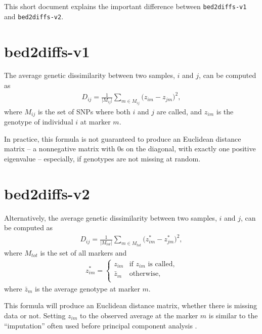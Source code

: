 \documentclass[draft,a4paper,10pt,DIV=15,titlepage,mpinclude=true]{scrartcl}
\newcommand{\keystring}[1]{{\tt #1}}
\begin{document}
This short document explains the important difference between \keystring{bed2diffs-v1} and \keystring{bed2diffs-v2}.

\section{bed2diffs-v1}

The average genetic dissimilarity between two samples, $i$ and $j$, can be computed as
\begin{align}
D_{ij} = \frac{1}{\big|M_{ij}\big|}\sum_{m\in M_{ij}}\big(z_{im} - z_{jm}\big)^2,
\end{align}
where $M_{ij}$ is the set of SNPs where both $i$ and $j$ are called, and $z_{im}$ is the genotype of individual $i$ at marker $m$.

In practice, this formula is not guaranteed to produce an Euclidean distance matrix -- a nonnegative matrix with 0s on the diagonal, with exactly one positive eigenvalue \cite{Gower:1982fk} -- especially, if genotypes are not missing at random.

\section{bed2diffs-v2}
Alternatively, the average genetic dissimilarity between two samples, $i$ and $j$, can be computed as
\begin{align}
D_{ij} = \frac{1}{\big|M_{tot}\big|}\sum_{m\in M_{tot}}\big(z^*_{im} - z^*_{jm}\big)^2,
\end{align}
where $M_{tot}$ is the set of all markers and
\begin{align}
z^*_{im} = \begin{cases}
z_{im} & \text{if $z_{im}$ is called,}\\
\bar{z}_m & \text{otherwise,} \\
\end{cases}
\end{align}
where $\bar{z}_m$ is the average genotype at marker $m$.

This formula will produce an Euclidean distance matrix, whether there is missing data or not. Setting $z_{im}$ to the observed average at the marker $m$ is similar to the ``imputation'' often used before principal component analysis \cite{Price:2006kx}.



\end{document}

